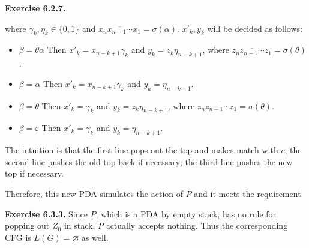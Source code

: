 \documentclass[a4paper]{article}
\newenvironment{exercise}[1]{
	\par
	\noindent\textbf{Exercise #1.}\quad
}{
	\par
	\bigskip
}
\begin{document}
\begin{exercise}{6.2.7}
\begin{center}
    \end{center}
    where $\gamma_k,\eta_k\in\{0,1\}$ and $\overline{x_nx_{n-1}\cdots x_1}=\sigma(\alpha)$.
    $x'_k,y_k$ will be decided as follows:
    \begin{itemize}
        \item $\beta=\theta\alpha$ Then $x'_k=x_{n-k+1}\gamma_k$ and
            $y_k=z_k\eta_{n-k+1}$, where $\overline{z_nz_{n-1}\cdots z_1}=\sigma(\theta)$.
        \item $\beta=\alpha$ Then $x'_k=x_{n-k+1}\gamma_k$ and $y_k=\eta_{n-k+1}$.
        \item $\beta=\theta$ Then $x'_k=\gamma_k$ and
            $y_k=z_k\eta_{n-k+1}$, where $\overline{z_nz_{n-1}\cdots z_1}=\sigma(\theta)$.
        \item $\beta=\varepsilon$ Then $x'_k=\gamma_k$ and $y_k=\eta_{n-k+1}$.
    \end{itemize}
    The intuition is that the first line pops out the top and makes match with $c$;
    the second line pushes the old top back if necessary;
    the third line pushes the new top if necessary.\par
    Therefore, this new PDA simulates the action of $P$ and it meets the requirement.
\end{exercise}

\begin{exercise}{6.3.3} Since $P$, which is a PDA by empty stack,
has no rule for popping out $Z_0$ in stack,
$P$ actually accepts nothing. Thus the corresponding CFG is $L(G)=\varnothing$
as well.
\end{exercise}
\end{document}
